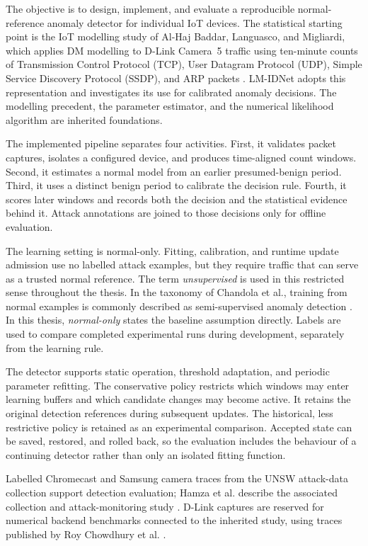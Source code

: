 The objective is to design, implement, and evaluate a reproducible
normal-reference anomaly detector for individual IoT devices. The
statistical starting point is the IoT modelling study of Al-Haj Baddar,
Languasco, and Migliardi, which applies DM modelling to D-Link Camera~5
traffic using ten-minute counts of Transmission Control Protocol (TCP),
User Datagram Protocol (UDP), Simple Service Discovery Protocol (SSDP),
and ARP packets \cite{alhajbaddar2025iot}. LM-IDNet adopts this
representation and investigates its use for calibrated anomaly decisions.
The modelling precedent, the parameter estimator, and the numerical
likelihood algorithm are inherited foundations.

The implemented pipeline separates four activities. First, it validates
packet captures, isolates a configured device, and produces time-aligned
count windows. Second, it estimates a normal model from an earlier
presumed-benign period. Third, it uses a distinct benign period to calibrate
the decision rule. Fourth, it scores later windows and records both the
decision and the statistical evidence behind it. Attack annotations are
joined to those decisions only for offline evaluation.

The learning setting is normal-only. Fitting, calibration, and runtime
update admission use no labelled attack examples, but they require traffic
that can serve as a trusted normal reference. The term \emph{unsupervised}
is used in this restricted sense throughout the thesis. In the taxonomy of
Chandola et al., training from normal examples is commonly described as
semi-supervised anomaly detection \cite{chandola2009}. In this thesis,
\emph{normal-only} states the baseline assumption directly. Labels are used
to compare completed experimental runs during development, separately from
the learning rule.

The detector supports static operation, threshold adaptation, and periodic
parameter refitting. The conservative policy restricts which windows may
enter learning buffers and which candidate changes may become active.
It retains the original detection references during subsequent updates.
The historical, less restrictive policy is retained as an experimental
comparison. Accepted state can be saved, restored, and rolled back, so the
evaluation includes the behaviour of a continuing detector rather than
only an isolated fitting function.

Labelled Chromecast and Samsung camera traces from the UNSW attack-data
collection support detection evaluation; Hamza et al. describe the
associated collection and attack-monitoring study \cite{hamza2019}. D-Link
captures are reserved for numerical backend benchmarks connected to the
inherited study, using traces published by Roy Chowdhury et al.
\cite{chowdhury2021data}.

